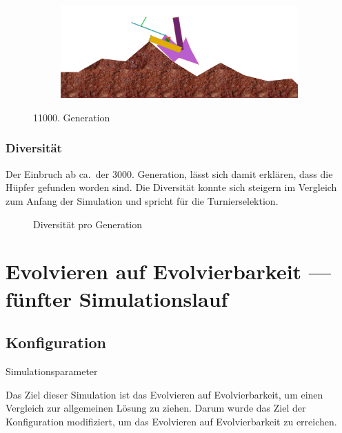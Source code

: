 \begin{figure}[H]
\begin{subfigure}[b]{0.45\textwidth}
            \includegraphics[width=\linewidth,center]{graphics/simulation-results/4_gen11000_4}
            \caption{\label{fig:gen11000_4}}
          \end{subfigure}
          \caption{11000. Generation\label{fig:gen11000}}
        \end{figure}

      \subsubsection{Diversität}

        Der Einbruch ab ca.\ der 3000. Generation, lässt sich damit erklären, dass die Hüpfer gefunden worden sind.
        Die Diversität konnte sich steigern im Vergleich zum Anfang der Simulation und
        spricht für die Turnierselektion.

        \begin{figure}[H]
          \centering
          
          \caption{Diversität pro Generation\label{fig:graphDivFourth}}
        \end{figure}

  \section{Evolvieren auf Evolvierbarkeit --- fünfter Simulationslauf\label{sec:5lauf}}

    \subsection{Konfiguration}

      \begin{table}[H]
        \centering
        
        \caption{Simulationsparameter}
      \end{table}

      Das Ziel dieser Simulation ist das Evolvieren auf Evolvierbarkeit,
      um einen Vergleich zur allgemeinen Lösung zu ziehen.
      Darum wurde das Ziel der Konfiguration modifiziert, um das Evolvieren auf Evolvierbarkeit zu erreichen.

